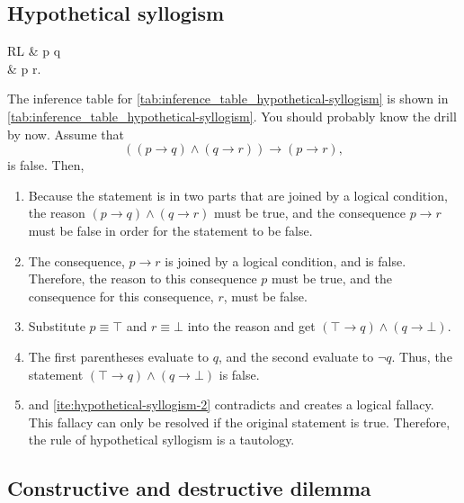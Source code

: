 \subsection{Hypothetical syllogism}
\label{sec:rules_of_inference_hypothetical-syllogism}

\begin{table}
  \centering
  \begin{tblr}{RL}
               & p \to q  \\

    \therefore & p \to r.
  \end{tblr}
  \caption{Inference table for the hypothetical syllogism}
  \label{tab:inference_table_hypothetical-syllogism}
\end{table}
The inference table for \cref{tab:inference_table_hypothetical-syllogism} is shown in \cref{tab:inference_table_hypothetical-syllogism}. You should probably know the drill by now. Assume that
\begin{equation}
  ((p \to q) \land (q \to r)) \to (p \to r),
\end{equation}
is false. Then,
\begin{enumerate}[noitemsep]
  \item Because the statement is in two parts that are joined by a logical condition, the reason $(p \to q) \land (q \to r)$ must be true, and the consequence $p \to r$ must be false in order for the statement to be false.
  \item\label{ite:hypothetical-syllogism-2} The consequence, $p \to r$ is joined by a logical condition, and is false. Therefore, the reason to this consequence $p$ must be true, and the consequence for this consequence, $r$, must be false.
  \item Substitute $p \equiv \top$ and $r \equiv \bot$ into the reason and get $(\top \to q) \land (q \to \bot)$.
  \item\label{ite:hypothetical-syllogism-4} The first parentheses evaluate to $q$, and the second evaluate to $\neg q$. Thus, the statement $(\top \to q) \land (q \to \bot)$ is false.
  \item {} and \cref{ite:hypothetical-syllogism-2} contradicts and creates a logical fallacy. This fallacy can only be resolved if the original statement is true. Therefore, the rule of hypothetical syllogism is a tautology.
\end{enumerate}

\subsection{Constructive and destructive dilemma}

